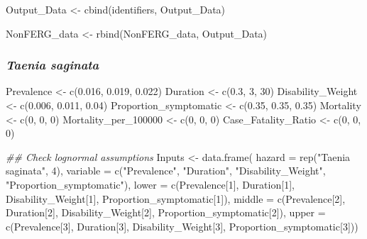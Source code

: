 \documentclass[
  letterpaper,
  DIV=11,
  numbers=noendperiod]{scrartcl}
\newenvironment{Shaded}{\begin{snugshade}}{\end{snugshade}}
\newcommand{\AttributeTok}[1]{\textcolor[rgb]{0.40,0.45,0.13}{#1}}
\newcommand{\DecValTok}[1]{\textcolor[rgb]{0.68,0.00,0.00}{#1}}
\newcommand{\DocumentationTok}[1]{\textcolor[rgb]{0.37,0.37,0.37}{\textit{#1}}}
\newcommand{\FloatTok}[1]{\textcolor[rgb]{0.68,0.00,0.00}{#1}}
\newcommand{\FunctionTok}[1]{\textcolor[rgb]{0.28,0.35,0.67}{#1}}
\newcommand{\NormalTok}[1]{\textcolor[rgb]{0.00,0.23,0.31}{#1}}
\newcommand{\OtherTok}[1]{\textcolor[rgb]{0.00,0.23,0.31}{#1}}
\newcommand{\StringTok}[1]{\textcolor[rgb]{0.13,0.47,0.30}{#1}}
\begin{document}
\begin{Shaded}
\begin{Highlighting}[]
\NormalTok{Output\_Data }\OtherTok{\textless{}{-}} \FunctionTok{cbind}\NormalTok{(identifiers,  Output\_Data)}

\NormalTok{NonFERG\_data }\OtherTok{\textless{}{-}} \FunctionTok{rbind}\NormalTok{(NonFERG\_data,  Output\_Data)}
\end{Highlighting}
\end{Shaded}

\subsubsection{\texorpdfstring{\emph{Taenia
saginata}}{Taenia saginata}}\label{taenia-saginata}

\begin{Shaded}
\begin{Highlighting}[]
\NormalTok{Prevalence }\OtherTok{\textless{}{-}} \FunctionTok{c}\NormalTok{(}\FloatTok{0.016}\NormalTok{, }\FloatTok{0.019}\NormalTok{, }\FloatTok{0.022}\NormalTok{)}
\NormalTok{Duration }\OtherTok{\textless{}{-}} \FunctionTok{c}\NormalTok{(}\FloatTok{0.3}\NormalTok{, }\DecValTok{3}\NormalTok{, }\DecValTok{30}\NormalTok{)}
\NormalTok{Disability\_Weight }\OtherTok{\textless{}{-}} \FunctionTok{c}\NormalTok{(}\FloatTok{0.006}\NormalTok{, }\FloatTok{0.011}\NormalTok{, }\FloatTok{0.04}\NormalTok{)}
\NormalTok{Proportion\_symptomatic }\OtherTok{\textless{}{-}} \FunctionTok{c}\NormalTok{(}\FloatTok{0.35}\NormalTok{, }\FloatTok{0.35}\NormalTok{, }\FloatTok{0.35}\NormalTok{)}
\NormalTok{Mortality }\OtherTok{\textless{}{-}} \FunctionTok{c}\NormalTok{(}\DecValTok{0}\NormalTok{, }\DecValTok{0}\NormalTok{, }\DecValTok{0}\NormalTok{)}
\NormalTok{Mortality\_per\_100000 }\OtherTok{\textless{}{-}} \FunctionTok{c}\NormalTok{(}\DecValTok{0}\NormalTok{, }\DecValTok{0}\NormalTok{, }\DecValTok{0}\NormalTok{)}
\NormalTok{Case\_Fatality\_Ratio }\OtherTok{\textless{}{-}} \FunctionTok{c}\NormalTok{(}\DecValTok{0}\NormalTok{, }\DecValTok{0}\NormalTok{, }\DecValTok{0}\NormalTok{)}

\DocumentationTok{\#\# Check lognormal assumptions}
\NormalTok{Inputs }\OtherTok{\textless{}{-}} \FunctionTok{data.frame}\NormalTok{(}
 \AttributeTok{hazard =} \FunctionTok{rep}\NormalTok{(}\StringTok{"Taenia saginata"}\NormalTok{,  }\DecValTok{4}\NormalTok{), }
 \AttributeTok{variable =} \FunctionTok{c}\NormalTok{(}\StringTok{"Prevalence"}\NormalTok{,  }\StringTok{"Duration"}\NormalTok{,  }\StringTok{"Disability\_Weight"}\NormalTok{,  }\StringTok{"Proportion\_symptomatic"}\NormalTok{), }
 \AttributeTok{lower =} \FunctionTok{c}\NormalTok{(Prevalence[}\DecValTok{1}\NormalTok{],  Duration[}\DecValTok{1}\NormalTok{],  Disability\_Weight[}\DecValTok{1}\NormalTok{],  Proportion\_symptomatic[}\DecValTok{1}\NormalTok{]), }
 \AttributeTok{middle =} \FunctionTok{c}\NormalTok{(Prevalence[}\DecValTok{2}\NormalTok{],  Duration[}\DecValTok{2}\NormalTok{],  Disability\_Weight[}\DecValTok{2}\NormalTok{],  Proportion\_symptomatic[}\DecValTok{2}\NormalTok{]), }
 \AttributeTok{upper =} \FunctionTok{c}\NormalTok{(Prevalence[}\DecValTok{3}\NormalTok{],  Duration[}\DecValTok{3}\NormalTok{],  Disability\_Weight[}\DecValTok{3}\NormalTok{],  Proportion\_symptomatic[}\DecValTok{3}\NormalTok{]))}


\end{Highlighting}
\end{Shaded}
\end{document}
